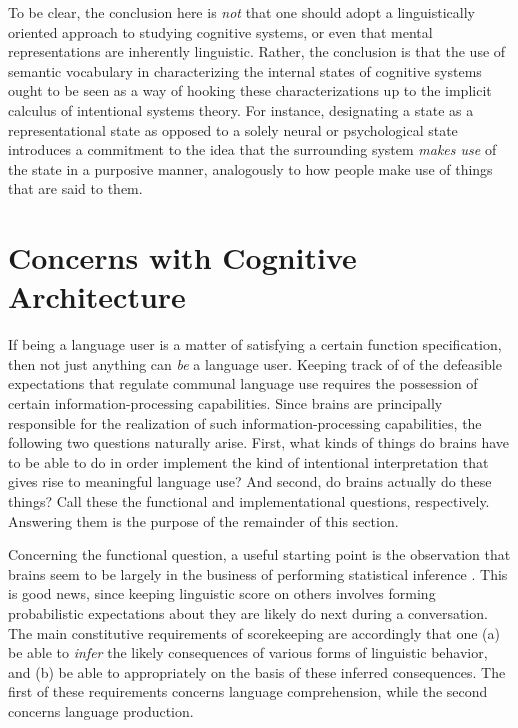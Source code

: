 To be clear, the conclusion here is \textit{not} that one should adopt a linguistically oriented approach to studying cognitive systems, or even that mental representations are inherently linguistic. Rather, the conclusion is that the use of semantic vocabulary in characterizing the internal states of cognitive systems ought to be seen as a way of hooking these characterizations up to the implicit calculus of intentional systems theory. For instance, designating a state as a representational state as opposed to a solely neural or psychological state introduces a commitment to the idea that the surrounding system \textit{makes use} of the state in a purposive manner, analogously to how people make use of things that are said to them. 

\section{Concerns with Cognitive Architecture}

If being a language user is a matter of satisfying a certain function specification, then not just anything can \textit{be} a language user. Keeping track of of the defeasible expectations that regulate communal language use requires the possession of certain information-processing capabilities. Since brains are principally responsible for the realization of such information-processing capabilities, the following two questions naturally arise. First, what kinds of things do brains have to be able to do in order implement the kind of intentional interpretation that gives rise to meaningful language use? And second, do brains actually do these things? Call these the functional and implementational questions, respectively. Answering them is the purpose of the remainder of this section. 

Concerning the functional question, a useful starting point is the observation that brains seem to be largely in the business of performing statistical inference \citep{Eliasmith:2007,clark:2013}. This is good news, since keeping linguistic score on others involves forming probabilistic expectations about they are likely do next during a conversation. The main constitutive requirements of scorekeeping are accordingly that one (a) be able to \textit{infer} the likely consequences of various forms of linguistic behavior, and (b) be able to  appropriately on the basis of these inferred consequences. The first of these requirements concerns language comprehension, while the second concerns language production. 


